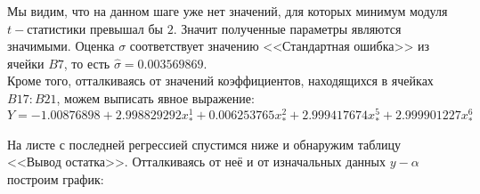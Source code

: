 \documentclass[14pt,a4paper]{scrartcl}
\begin{document}
\begin{figure}[h]
\end{figure}

Мы видим, что на данном шаге уже нет значений, для которых минимум модуля $t-$статистики превышал бы $2$. Значит полученные параметры являются значимыми. Оценка $\sigma$ соответствует значению <<Стандартная ошибка>> из ячейки $B7$, то есть $\hat{\sigma} = 0.003569869$.\\
Кроме того, отталкиваясь от значений коэффициентов, находящихся в ячейках $B17:B21$, можем выписать явное выражение:
\begin{equation*}
Y = -1.00876898 + 2.998829292 x_*^1 + 0.006253765 x_*^2 + 2.999417674 x_*^5 + 2.999901227 x_*^6
\end{equation*}

На листе с последней регрессией спустимся ниже и обнаружим таблицу <<Вывод остатка>>. Отталкиваясь от неё и от изначальных данных $y-\alpha$ построим график:

\begin{figure}[h]
\end{figure}
\end{document}
